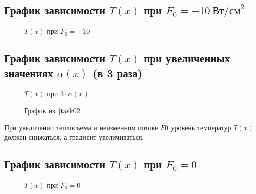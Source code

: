 \subsection{График зависимости $T(x)$ при $F_0 = -10\ \text{Вт/см}^2$}
\begin{figure}[H]
    \centering
    \caption{$T(x)$ при $F_0 = -10$}\label{img:plot02}
    
\end{figure}

\subsection{График зависимости $T(x)$ при увеличенных значениях $\alpha(x)$ (в 3 раза)}
\begin{figure}[H]
    \centering
    \caption{$T(x)$ при $3 \cdot \alpha(x)$}\label{img:plot03}
    
\end{figure}
\begin{figure}[H]
    \centering
    \caption{График из~\ref{task02}}\label{img:plot01_}
    
\end{figure}
При увеличении теплосъема и неизменном потоке $F0$ уровень температур $T(x)$ должен снижаться, а градиент увеличиваться.

\subsection{График зависимости $T(x)$ при $F_0 = 0$}
\begin{figure}[H]
    \centering
    \caption{$T(x)$ при $F_0 = 0$}\label{img:plot04}
    
\end{figure}


